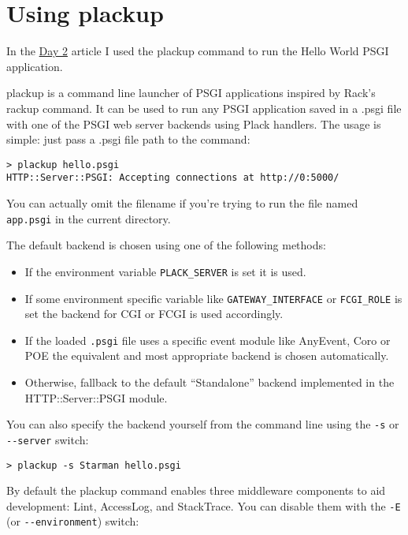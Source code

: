 \chapter{Using plackup}\label{day-3-using-plackup}

In the
\href{http://advent.plackperl.org/2009/12/day-2-hello-world.html}{Day 2}
article I used the plackup command to run the Hello World PSGI
application.

plackup is a command line launcher of PSGI applications inspired by
Rack's rackup command. It can be used to run any PSGI application saved
in a .psgi file with one of the PSGI web server backends using Plack
handlers. The usage is simple: just pass a .psgi file path to the
command:

\begin{lstlisting}
> plackup hello.psgi
HTTP::Server::PSGI: Accepting connections at http://0:5000/
\end{lstlisting}

You can actually omit the filename if you're trying to run the file
named \lstinline!app.psgi! in the current directory.

The default backend is chosen using one of the following methods:

\begin{itemize}
\itemsep1pt\parskip0pt
\item
  If the environment variable \lstinline!PLACK_SERVER! is set it is
  used.
\item
  If some environment specific variable like
  \lstinline!GATEWAY_INTERFACE! or \lstinline!FCGI_ROLE! is set the
  backend for CGI or FCGI is used accordingly.
\item
  If the loaded \lstinline!.psgi! file uses a specific event module like
  AnyEvent, Coro or POE the equivalent and most appropriate backend is
  chosen automatically.
\item
  Otherwise, fallback to the default ``Standalone'' backend implemented
  in the HTTP::Server::PSGI module.
\end{itemize}

You can also specify the backend yourself from the command line using
the \lstinline!-s! or \lstinline!--server! switch:

\begin{lstlisting}
> plackup -s Starman hello.psgi
\end{lstlisting}

By default the plackup command enables three middleware components to
aid development: Lint, AccessLog, and StackTrace. You can disable them
with the \lstinline!-E! (or \lstinline!--environment!) switch:

